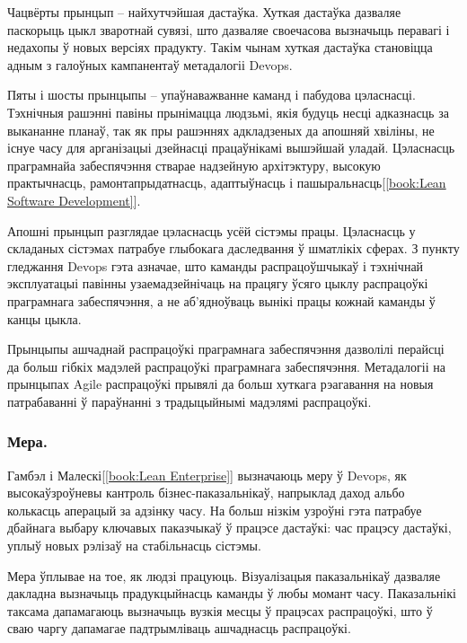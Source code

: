 Чацвёрты прынцып -- найхутчэйшая дастаўка.
Хуткая дастаўка дазваляе паскорыць цыкл зваротнай сувязі, што
дазваляе своечасова вызначыць перавагі і недахопы ў новых
версіях прадукту.
Такім чынам хуткая дастаўка становіцца адным з галоўных кампанентаў
метадалогіі Devops.

Пяты і шосты прынцыпы -- упаўнаважванне каманд і пабудова цэласнасці.
Тэхнічныя рашэнні павіны прынімацца людзьмі, якія будуць несці
адказнасць за выкананне планаў, так як пры рашэннях адкладзеных
да апошняй хвіліны, не існуе часу для арганізацыі дзейнасці
працаўнікамі вышэйшай уладай.
Цэласнасць праграмнайа забеспячэння стварае надзейную архітэктуру,
высокую практычнасць, рамонтапрыдатнасць, адаптыўнасць
і пашыральнасць[\ref{book:Lean Software Development}].

Апошні прынцып разглядае цэласнасць усёй сістэмы працы.
Цэласнасць у складаных сістэмах патрабуе глыбокага
даследвання ў шматлікіх сферах.
З пункту гледжання Devops гэта азначае, што каманды
распрацоўшчыкаў і тэхнічнай эксплуатацыі павінны
узаемадзейнічаць на працягу ўсяго цыклу распрацоўкі
праграмнага забеспячэння, а не аб'ядноўваць вынікі
працы кожнай каманды ў канцы цыкла.

Прынцыпы ашчаднай распрацоўкі праграмнага забеспячэння
дазволілі перайсці да больш гібкіх мадэлей распрацоўкі
праграмнага забеспячэння.
Метадалогіі на прынцыпах Agile распрацоўкі прывялі да
больш хуткага рэагавання на новыя патрабаванні ў параўнанні
з традыцыйнымі мадэлямі распрацоўкі.

\subsubsection{Мера.}
Гамбэл і Малескі[\ref{book:Lean Enterprise}] вызначаюць меру
ў Devops, як высокаўзроўневы кантроль бізнес-паказальнікаў,
напрыклад даход альбо колькасць аперацый за адзінку часу.
На больш нізкім узроўні гэта патрабуе дбайнага выбару ключавых
паказчыкаў ў працэсе дастаўкі: час працэсу дастаўкі,
уплыў новых рэлізаў на стабільнасць сістэмы.

Мера ўплывае на тое, як людзі працуюць.
Візуалізацыя паказальнікаў дазваляе дакладна
вызначыць прадукцыйнасць каманды ў любы момант часу.
Паказальнікі таксама дапамагаюць вызначыць
вузкія месцы ў працэсах распрацоўкі, што ў сваю чаргу
дапамагае падтрымліваць ашчаднасць распрацоўкі.

